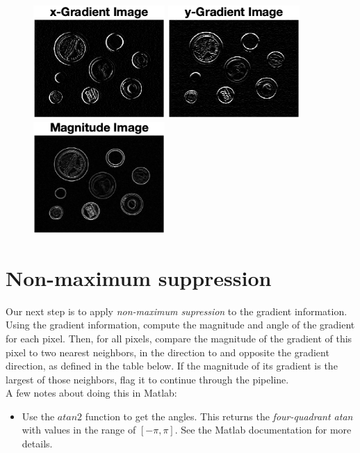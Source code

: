 \documentclass[12pt]{article}
\begin{document}
\begin{figure}[htp]
    \centering
    \includegraphics[width=5cm]{x-filter.png}
    \includegraphics[width=5cm]{y-filter.png}
    \includegraphics[width=5cm]{magnitude-filter.png}
\end{figure}

\newpage
\section{Non-maximum suppression}
Our next step is to apply \emph{non-maximum supression} to the gradient information.\\

\noindent
Using the gradient information, compute the magnitude and angle of the gradient for each pixel.   Then, for all pixels, compare the magnitude of the gradient of this pixel to two nearest neighbors, in the direction to and opposite the gradient direction, as defined in the table below.  If the magnitude of its gradient is the largest of those neighbors, flag it to continue through the pipeline.\\

\noindent
A few notes about doing this in Matlab:
\begin{itemize}
\item Use the $atan2$ function to get the angles.  This returns the \emph{four-quadrant atan} with values in the range of $[-\pi, \pi]$.  See the Matlab documentation for more details.
\end{itemize}
\end{document}
